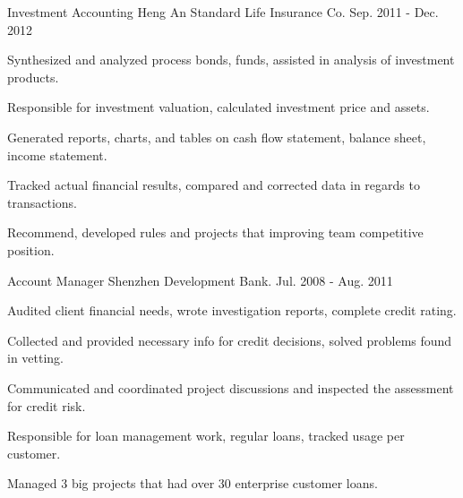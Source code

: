 \documentclass[11pt, a4paper]{awesome-cv}
\begin{document}
\begin{cventries}
\cventry
{Investment Accounting} %
{Heng An Standard Life Insurance Co.} %
{} %
{Sep. 2011 - Dec. 2012} %
{
  \begin{cvitems} %
    \item {Synthesized and analyzed process bonds, funds, assisted in analysis of investment products.}
    \item {Responsible for investment valuation, calculated investment price and assets.}
    \item {Generated reports, charts, and tables on cash flow statement, balance sheet, income statement.}
    \item {Tracked actual financial results, compared and corrected data in regards to transactions.}
    \item {Recommend, developed rules and projects that improving team competitive position.}
  \end{cvitems}
}

\cventry
{Account Manager} %
{Shenzhen Development Bank.} %
{} %
{Jul. 2008 - Aug. 2011} %
{
  \begin{cvitems} %
    \item {Audited client financial needs, wrote investigation reports, complete credit rating.}
    \item {Collected and provided necessary info for credit decisions, solved problems found in vetting.}
    \item {Communicated and coordinated project discussions and inspected the assessment for credit risk.}
    \item {Responsible for loan management work, regular loans, tracked usage per customer.}
    \item {Managed 3 big projects that had over 30 enterprise customer loans.}
  \end{cvitems}
}

\end{cventries}



\end{document}
